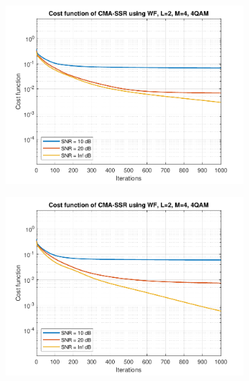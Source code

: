 \begin{figure}
	\centering
	\begin{subfigure}[b]{0.45\textwidth}
		\includegraphics[width=\linewidth]{./figs/BF_WF_cost_4QAM_L=2_M=4_K=200.pdf}
		\label{fig:wf_cost200}
	\end{subfigure}
	\begin{subfigure}[b]{0.45\textwidth}
		\includegraphics[width=\linewidth]{./figs/BF_WF_cost_4QAM_L=2_M=4_K=1000.pdf}
		\label{fig:wf_cost1000}
	\end{subfigure}\\
	\begin{subfigure}[b]{0.45\textwidth}

\end{subfigure}
\end{figure}
